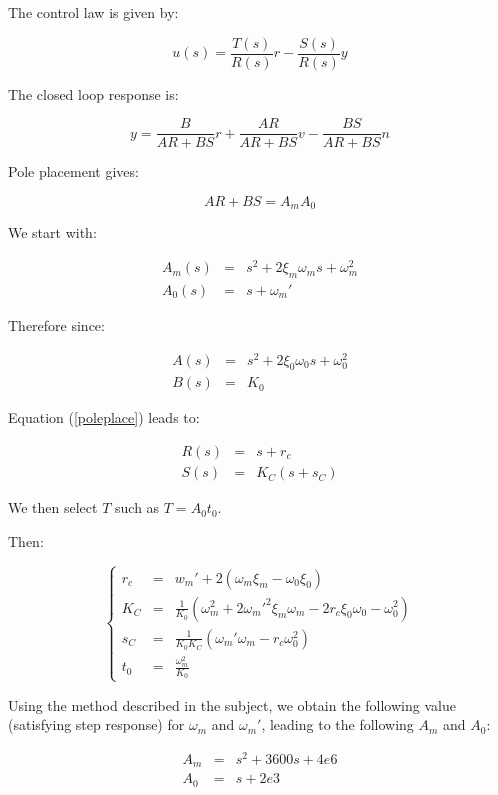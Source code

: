 The control law is given by:

$$u(s) = \frac{T(s)}{R(s)} r - \frac{S(s)}{R(s)}y$$

The closed loop response is:

$$y = \frac{B}{AR+BS} r + \frac{AR}{AR+BS}v - \frac{BS}{AR+BS}n$$

Pole placement gives:

\begin{equation} AR + BS = A_m A_0 \label{poleplace} \end{equation}

We start with:

$$
\begin{array}{rcl} A_m(s) & = &  s^2 + 2 \xi_m \omega_m s + \omega_m^2 \\ A_0(s) & = & s + \omega_m' \end{array} 
$$

Therefore since:

$$\begin{array}{rcl} A(s) & =&  s^2 + 2 \xi_0 \omega_0 s + \omega_0^2 \\ B(s) & = & K_0 \end{array}$$

Equation (\ref{poleplace}) leads to:

$$\begin{array}{rcl} R(s) & =&  s+r_c \\ S(s) & = & K_C(s+s_C) \end{array}$$

We then select $T$ such as $T = A_0 t_0$.

Then:

$$\left\{\begin{array}{rcl} 
r_c & = & w_m' + 2(\omega_m \xi_m -\omega_0 \xi_0)  \\
K_C & = & \frac{1}{K_0} \left(\omega_m^2 + 2 \omega_m'^2 \xi_m \omega_m - 2 r_c \xi_0 \omega_0 - \omega_0^2\right) \\
s_C & = & \frac{1}{K_0 K_C}(\omega_m' \omega_m - r_c \omega_0^2) \\
t_0 & = & \frac{\omega_m^2}{K_0}
\end{array}\right.$$


Using the method described in the subject, we obtain the following value (satisfying step response) for $\omega_m$ and $\omega_m'$, leading to the following $A_m$ and $A_0$:

$$\begin{array}{rcl}
   A_m & = & s^2 + 3600s + 4e6 \\
   A_0 & = & s+2e3\\
  \end{array}$$
  
